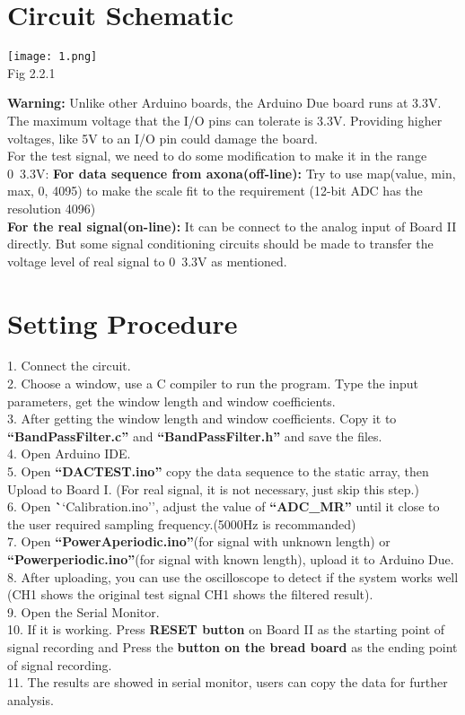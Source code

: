 \documentclass[12pt]{report}
\begin{document}
\section{Circuit Schematic}
\vspace{5pt}
\begin{center}
\texttt{[image: 1.png]}\\
\textup{\footnotesize Fig 2.2.1\\}
\end{center}
\textbf{Warning:} Unlike other Arduino boards, the Arduino Due board runs at 3.3V. The maximum voltage that the I/O pins can tolerate is 3.3V. Providing higher voltages, like 5V to an I/O pin could damage the board.\\For the test signal, we need to do some modification to make it in the range 0~3.3V:\vspace{3pt}
\textbf{For data sequence from axona(off-line):}
Try to use map(value, min, max, 0, 4095) to make the scale fit to the requirement (12-bit ADC has the resolution 4096)\\
\textbf{For the real signal(on-line):}
\textup{It can be connect to the analog input of Board II directly. But some signal conditioning circuits should be made to transfer the voltage level of real signal to 0~3.3V as mentioned.}
\vspace{5pt}
\section{Setting Procedure}
1. Connect the circuit.\\
2. Choose a window, use a C compiler to run the program. Type the input parameters, get the window length and window coefficients.\\
3. After getting the window length and window coefficients. Copy it to \textbf{``BandPassFilter.c''} and \textbf{``BandPassFilter.h''} and save the files.\\
4. Open Arduino IDE.\\
5. Open \textbf{``DACTEST.ino''} copy the data sequence to the static array, then Upload to Board I. (For real signal, it is not necessary, just skip this step.)\\
6. Open \textbf``Calibration.ino'', adjust the value of \textbf{``ADC\_MR''} until it close to the user required sampling frequency.(5000Hz is recommanded)\\
7. Open \textbf{``PowerAperiodic.ino''}(for signal with unknown length) or \textbf{``Powerperiodic.ino''}(for signal with known length), upload it to Arduino Due.\\
8. After uploading, you can use the oscilloscope to detect if the system works well
(CH1 shows the original test signal CH1 shows the filtered result).\\
9. Open the Serial Monitor.\\
10. If it is working. Press \textbf{RESET button} on Board II as the starting point of signal recording and Press the \textbf{button on the bread board} as the ending point of signal recording.\\
11. The results are showed in serial monitor, users can copy the data for further analysis.\\
\newpage
\end{document}
